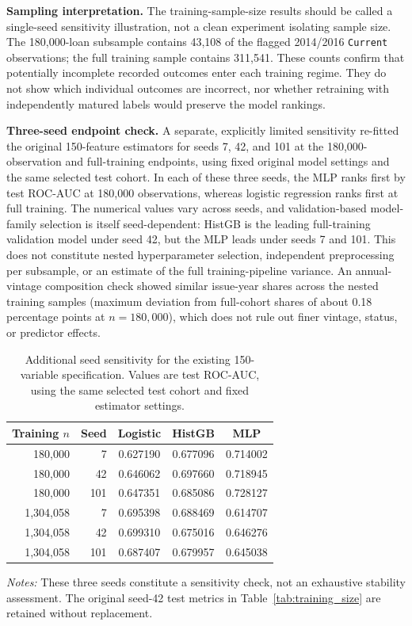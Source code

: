 \documentclass[10pt]{article}
\begin{document}
\noindent\textbf{Sampling interpretation.} The training-sample-size results should be called a single-seed sensitivity illustration, not a clean experiment isolating sample size. The 180,000-loan subsample contains 43,108 of the flagged 2014/2016 \texttt{Current} observations; the full training sample contains 311,541. These counts confirm that potentially incomplete recorded outcomes enter each training regime. They do not show which individual outcomes are incorrect, nor whether retraining with independently matured labels would preserve the model rankings.

\noindent\textbf{Three-seed endpoint check.} A separate, explicitly limited sensitivity re-fitted the original 150-feature estimators for seeds 7, 42, and 101 at the 180,000-observation and full-training endpoints, using fixed original model settings and the same selected test cohort. In each of these three seeds, the MLP ranks first by test ROC-AUC at 180,000 observations, whereas logistic regression ranks first at full training. The numerical values vary across seeds, and validation-based model-family selection is itself seed-dependent: HistGB is the leading full-training validation model under seed 42, but the MLP leads under seeds 7 and 101. This does not constitute nested hyperparameter selection, independent preprocessing per subsample, or an estimate of the full training-pipeline variance. An annual-vintage composition check showed similar issue-year shares across the nested training samples (maximum deviation from full-cohort shares of about 0.18 percentage points at $n=180{,}000$), which does not rule out finer vintage, status, or predictor effects.

\begin{table}[!ht]
\centering
\caption{Additional seed sensitivity for the existing 150-variable specification. Values are test ROC-AUC, using the same selected test cohort and fixed estimator settings.}
\label{tab:r2_seed_sensitivity}
\begin{tabular}{rrccc}
\toprule
Training $n$ & Seed & Logistic & HistGB & MLP \\
\midrule
180,000 & 7 & 0.627190 & 0.677096 & 0.714002 \\
180,000 & 42 & 0.646062 & 0.697660 & 0.718945 \\
180,000 & 101 & 0.647351 & 0.685086 & 0.728127 \\
\midrule
1,304,058 & 7 & 0.695398 & 0.688469 & 0.614707 \\
1,304,058 & 42 & 0.699310 & 0.675016 & 0.646276 \\
1,304,058 & 101 & 0.687407 & 0.679957 & 0.645038 \\
\bottomrule
\end{tabular}
\par\vspace{2pt}
{\footnotesize \textit{Notes:} These three seeds constitute a sensitivity check, not an exhaustive stability assessment. The original seed-42 test metrics in Table~\ref{tab:training_size} are retained without replacement.}
\end{table}
\end{document}
